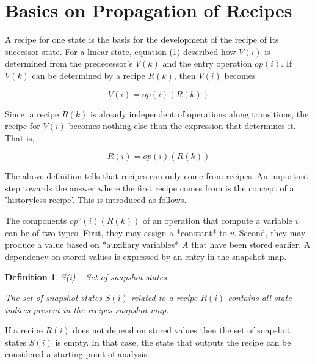 \documentclass[12pt,a4paper]{scrartcl}
\newtheorem{definition}{Definition}
\begin{document}
%
\section{Basics on Propagation of Recipes}

A recipe for one state is the basis for the development of the recipe of its
successor state. For a linear state, equation (1) described how $V(i)$ is
determined from the predecessor's $V(k)$ and the entry operation $op(i)$. If
$V(k)$ can be determined by a recipe $R(k)$, then $V(i)$ becomes

\begin{equation} \label{eq:accumulation2}
                     V(i) = op(i)(R(k))                                     
\end{equation}

Since, a recipe $R(k)$ is already independent of operations along transitions,
the recipe for $V(i)$ becomes nothing else than the expression that
determines it. That is,

\begin{equation} \label{eq:accumulation3}
                     R(i) = { op(i)(R(k)) }                                 
\end{equation}
                 
The above definition tells that recipes can only come from recipes. An
important step towards the answer where the first recipe comes from is the
concept of a 'historyless recipe'. This is introduced as follows. 

The components $op^v(i)(R(k))$ of an operation that compute a variable $v$
can be of two types. First, they may assign a *constant* to $v$. Second, they may
produce a value based on *auxiliary variables* $A$ that have been stored earlier.
A dependency on stored values is expressed by an entry in the snapshot map.

\begin{definition}
S(i) -- Set of snapshot states.

The set of snapshot states $S(i)$ related to a recipe $R(i)$ contains
all state indices present in the recipes snapshot map.
\end{definition}

If a recipe $R(i)$ does not depend on stored values then the set of snapshot
states $S(i)$ is empty. In that case, the state that outputs the recipe can 
be considered a starting point of analysis.
\end{document}
